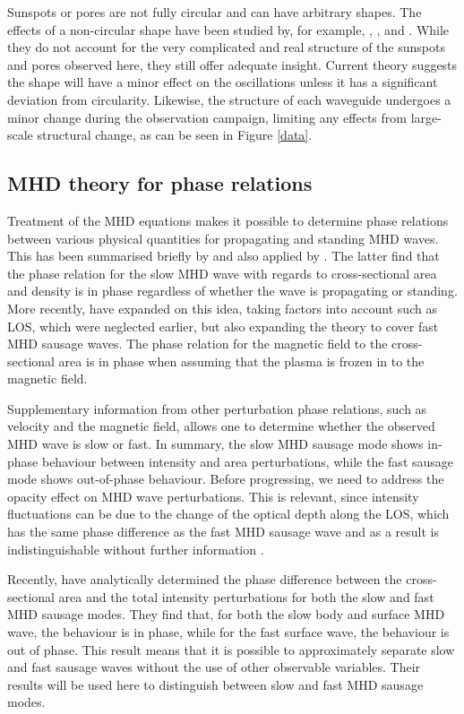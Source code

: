 	Sunspots or pores are not fully circular and can have arbitrary shapes.
	The effects of a non-circular shape have been studied by, for example, \citet{2003A&A...409..287R}, \citet{2009A&A...502..315M}, and \citet{2011A&A...527A..53M}.
	While they do not account for the very complicated and real structure of the sunspots and pores observed here, they still offer adequate insight.
	Current theory suggests the shape will have a minor effect on the oscillations unless it has a significant deviation from circularity.
	Likewise, the structure of each waveguide undergoes a minor change during the observation campaign, limiting any effects from large-scale structural change, as can be seen in Figure \ref{data}.

\subsection{MHD theory for phase relations}
	
	Treatment of the MHD equations makes it possible to determine phase relations between various physical quantities for propagating and standing MHD waves.
	This has been summarised briefly by \citet{goedbloed} and also applied by \citet{PMHDW}.
	The latter find that the phase relation for the slow MHD wave with regards to cross-sectional area and density is in phase regardless of whether the wave is propagating or standing.
	More recently, \citet{Moreels2013} have expanded on this idea, taking factors into account such as LOS, which were neglected earlier, but also expanding the theory to cover fast MHD sausage waves.
	The phase relation for the magnetic field to the cross-sectional area is in phase when assuming that the plasma is frozen in to the magnetic field.
	
	Supplementary information from other perturbation phase relations, such as velocity and the magnetic field, allows one to determine whether the observed MHD wave is slow or fast.
	In summary, the slow MHD sausage mode shows in-phase behaviour between intensity and area perturbations, while the fast sausage mode shows out-of-phase behaviour.
	Before progressing, we need to address the opacity effect on MHD wave perturbations.
	This is relevant, since intensity fluctuations can be due to the change of the optical depth along the LOS, which has the same phase difference as the fast MHD sausage wave and as a result is indistinguishable without further information \citep{PMHDW}.
	
	Recently, \citet{Moreels2013b} have analytically determined the phase difference between the cross-sectional area and the total intensity perturbations for both the slow and fast MHD sausage modes.
	They find that, for both the slow body and surface MHD wave, the behaviour is in phase, while for the fast surface wave, the behaviour is out of phase.
	This result means that it is possible to approximately separate slow and fast sausage waves without the use of other observable variables. Their results will be used here to distinguish between slow and fast MHD sausage modes.

